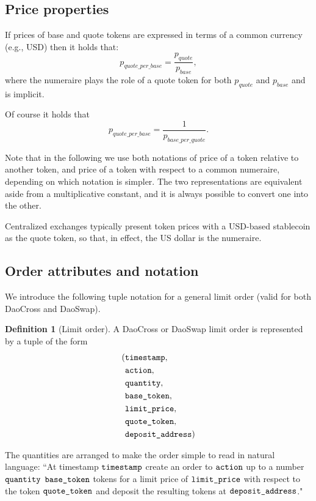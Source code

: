 \documentclass[11pt, reqno]{amsart}
\theoremstyle{definition}
\newtheorem{defn}{Definition}[subsection]
\theoremstyle{remark}
\newcommand{\timestamp}{\textnormal{\texttt{timestamp}}}
\newcommand{\action}{\textnormal{\texttt{action}}}
\newcommand{\quantity}{\textnormal{\texttt{quantity}}}
\newcommand{\basetoken}{\textnormal{\texttt{base\_token}}}
\newcommand{\limitprice}{\textnormal{\texttt{limit\_price}}}
\newcommand{\quotetoken}{\textnormal{\texttt{quote\_token}}}
\newcommand{\depositaddress}{\textnormal{\texttt{deposit\_address}}}
\begin{document}
\subsection{Price properties}
If prices of base and quote tokens are expressed in terms of a common currency
(e.g., USD) then it holds that:
\[
	p_{quote\_per\_base} = \frac{p_{quote}}{p_{base}},
\]
where the numeraire plays the role of a quote token for both $p_{quote}$ and
$p_{base}$ and is implicit.

Of course it holds that
\[
	p_{quote\_per\_base} =
	\frac{1}{p_{base\_per\_quote}}.
\]

Note that in the following we use both notations of price of a token relative to
another token, and price of a token with respect to a common numeraire, depending
on which notation is simpler.
The two representations are equivalent aside from a multiplicative constant, and
it is always possible to convert one into the other.

Centralized exchanges typically present token prices with a USD-based stablecoin
as the quote token, so that, in effect, the US dollar is the numeraire.

\subsection{Order attributes and notation}
We introduce the following tuple notation for a general limit order
(valid for both DaoCross and DaoSwap).
\begin{defn}[Limit order]
A DaoCross or DaoSwap limit order is represented by a tuple of the form
\begin{align*}
( & \timestamp,       \\
  & \action,          \\
  & \quantity,        \\
  & \basetoken,       \\
  & \limitprice,      \\
  & \quotetoken,      \\
  & \depositaddress )
\end{align*}
\end{defn}

The quantities are arranged to make the order simple to read in natural
language:
``At timestamp $\timestamp$ create an order to $\action$ up to a number
$\quantity$ $\basetoken$ tokens for a limit price of $\limitprice$ with respect
to the token $\quotetoken$ and deposit the resulting tokens at
$\depositaddress$."
\end{document}
